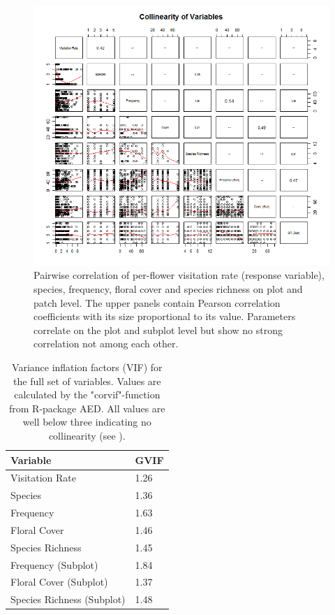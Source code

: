 \newpage

\begin{figure} [H] %
\centering
\includegraphics[width=16cm]{Images/pairs-plot}
 \caption{Pairwise correlation of per-flower visitation rate (response variable), species, frequency, floral cover and species richness on plot and patch level. The upper panels contain Pearson correlation coefficients with its size proportional to its value. Parameters correlate on the plot and subplot level but show no strong correlation not among each other.}
 \label{fig:pairs-plot}
\end{figure}


\begin{table}[!htbp] 
  \centering
  \caption{Variance inflation factors (VIF) for the full set of variables. Values are calculated by the "corvif"-function from R-package AED. All values are well below three indicating no collinearity (see \citet{zuur2007analysing}).}
    \begin{tabular}{ll}
    \toprule
    \textbf{Variable} & \textbf{GVIF}\\
    \midrule
    Visitation Rate  	&  1.26\\
    Species 			 &  1.36\\
    Frequency 	  	    &  1.63\\
    Floral Cover   		 &  1.46\\
    Species Richness     &  1.45\\
    Frequency (Subplot) 	    &  1.84\\
    Floral Cover (Subplot)		  &  1.37\\
    Species Richness (Subplot)    &  1.48\\
    \bottomrule
    \end{tabular}%
\label{tab:VIF}
\end{table}%

